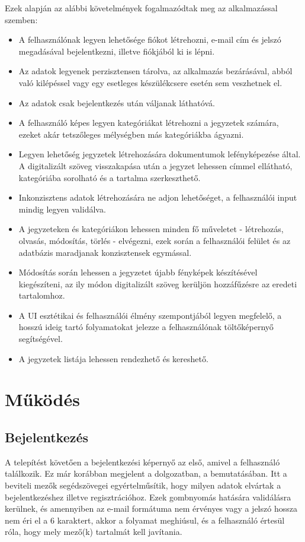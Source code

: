 Ezek alapján az alábbi követelmények fogalmazódtak meg az alkalmazással szemben:
\begin{itemize}
	\item A felhasználónak legyen lehetősége fiókot létrehozni, e-mail cím és jelszó megadásával bejelentkezni, illetve fiókjából ki is lépni.
	\item Az adatok legyenek perzisztensen tárolva, az alkalmazás bezárásával, abból való kilépéssel vagy egy esetleges készülékcsere esetén sem veszhetnek el.
	\item Az adatok csak bejelentkezés után váljanak láthatóvá.
	\item A felhasználó képes legyen kategóriákat létrehozni a jegyzetek számára, ezeket akár tetszőleges mélységben más kategóriákba ágyazni.
	\item Legyen lehetőség jegyzetek létrehozására dokumentumok lefényképezése által. A digitalizált szöveg visszakapása után a jegyzet lehessen címmel ellátható, kategóriába sorolható és a tartalma szerkeszthető.
	\item Inkonzisztens adatok létrehozására ne adjon lehetőséget, a felhasználói input mindig legyen validálva.
	\item A jegyzeteken és kategóriákon lehessen minden fő műveletet - létrehozás, olvasás, módosítás, törlés - elvégezni, ezek során a felhasználói felület és az adatbázis maradjanak konzisztensek egymással.
	\item Módosítás során lehessen a jegyzetet újabb fényképek készítésével kiegészíteni, az ily módon digitalizált szöveg kerüljön hozzáfűzésre az eredeti tartalomhoz.
	\item A UI esztétikai és felhasználói élmény szempontjából legyen megfelelő, a hosszú ideig tartó folyamatokat jelezze a felhasználónak töltőképernyő segítségével. 
	\item A jegyzetek listája lehessen rendezhető és kereshető. 
\end{itemize}

\section{Működés}

\subsection{Bejelentkezés}
A telepítést követően a bejelentkezési képernyő az első, amivel a felhasználó találkozik. Ez már korábban megjelent a dolgozatban, a  bemutatásában. Itt a beviteli mezők segédszövegei egyértelműsítik, hogy milyen adatok elvártak a bejelentkezéshez illetve regisztrációhoz. Ezek gombnyomás hatására validálásra kerülnek, és amennyiben az e-mail formátuma nem érvényes vagy a jelszó hossza nem éri el a 6 karaktert, akkor a folyamat meghiúsul, és a felhasználó értesül róla, hogy mely mező(k) tartalmát kell javítania. 

